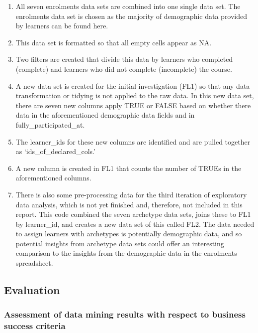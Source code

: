 \documentclass[
]{article}
\begin{document}
\begin{enumerate}
\def\labelenumi{\arabic{enumi}.}
\item
  All seven enrolments data sets are combined into one single data set.
  The enrolments data set is chosen as the majority of demographic data
  provided by learners can be found here.
\item
  This data set is formatted so that all empty cells appear as NA.
\item
  Two filters are created that divide this data by learners who
  completed (complete) and learners who did not complete (incomplete)
  the course.
\item
  A new data set is created for the initial investigation (FL1) so that
  any data transformation or tidying is not applied to the raw data. In
  this new data set, there are seven new columns apply TRUE or FALSE
  based on whether there data in the aforementioned demographic data
  fields and in fully\_participated\_at.
\item
  The learner\_ids for these new columns are identified and are pulled
  together as `ids\_of\_declared\_cols.'
\item
  A new column is created in FL1 that counts the number of TRUEs in the
  aforementioned columns.
\item
  There is also some pre-processing data for the third iteration of
  exploratory data analysis, which is not yet finished and, therefore,
  not included in this report. This code combined the seven archetype
  data sets, joins these to FL1 by learner\_id, and creates a new data
  set of this called FL2. The data needed to assign learners with
  archetypes is potentially demographic data, and so potential insights
  from archetype data sets could offer an interesting comparison to the
  insights from the demographic data in the enrolments spreadsheet.
\end{enumerate}

\hypertarget{evaluation}{%
\subsection{Evaluation}\label{evaluation}}

\hypertarget{assessment-of-data-mining-results-with-respect-to-business-success-criteria}{%
\subsubsection{Assessment of data mining results with respect to
business success
criteria}\label{assessment-of-data-mining-results-with-respect-to-business-success-criteria}}
\end{document}
